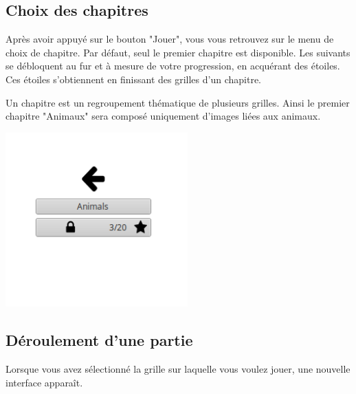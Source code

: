 \documentclass[a4paper, 12pt]{report}
\begin{document}
        \subsection{Choix des chapitres}
        
            Après avoir appuyé sur le bouton "Jouer", vous vous retrouvez sur le menu de choix de chapitre.
            Par défaut, seul le premier chapitre est disponible. Les suivants se débloquent au fur et à mesure de votre progression, en acquérant des étoiles. 
            Ces étoiles s'obtiennent en finissant des grilles d'un chapitre.
            
            Un chapitre est un regroupement thématique de plusieurs grilles. Ainsi le premier chapitre "Animaux" sera composé uniquement d'images liées aux animaux. 
            
            \begin{minipage}{\linewidth}
                    \centering
			        \includegraphics[width=7cm]{screenChoixChapitre.png}
	        \end{minipage}
            
        \subsection{Déroulement d'une partie}
        
            Lorsque vous avez sélectionné la grille sur laquelle vous voulez jouer, une nouvelle interface apparaît. 
            
\end{document}

